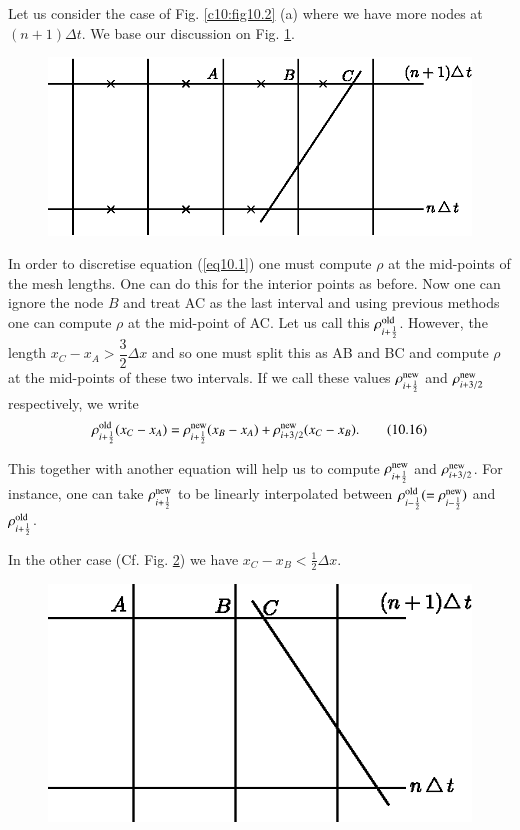 Let us consider the case of Fig. \ref{c10:fig10.2} (a) where we have
more nodes at 
$(n+1)\Delta t$. We base our discussion on Fig. \ref{c10:fig10.3}. 

\begin{figure}[H]
\centering
\includegraphics{figures/fig52-10.3.eps}
\caption{}\label{c10:fig10.3}
\end{figure}\pageoriginale

In order to discretise equation (\ref{eq10.1}) one must compute $\rho$ at the mid-points of the mesh lengths. One can do this for the interior points as before. Now one can ignore the node $B$ and treat AC as the last interval and using previous methods one can compute $\rho$ at the mid-point of AC. Let us call this $\rho^{\rm old}_{i+\frac{1}{2}}$. However, the length $x_C - x_A > \dfrac{3}{2} \Delta x $ and so one must split this as AB and BC and compute $\rho$ at the mid-points of these two intervals. If we call these values $\rho^{\rm new}_{i+\frac{1}{2}}$ and $\rho^{\rm new}_{i+3/2}$ respectively, we write
\begin{equation*}
\rho^{\rm old}_{i+\frac{1}{2}} (x_C - x_A) = \rho^{\rm new}_{i+\frac{1}{2}} (x_B- x_A) + \rho^{\rm new}_{i+3/2} (x_C - x_B). \tag{10.16}\label{eq10.16}
\end{equation*}

This together with another equation will help us to compute $\rho^{\rm
  new}_{i+\frac{1}{2}}$ and $\rho^{\rm new}_{i+3/2}$. For instance,
one can take $\rho^{\rm new}_{i+\frac{1}{2}}$ to be linearly
interpolated between $\rho^{\rm old}_{i-\frac{1}{2}} (=\rho^{\rm
  new}_{i-\frac{1}{2}})$ and $\rho^{\rm old}_{i+\frac{1}{2}}$. 

In the other case (Cf. Fig. \ref{c10:fig10.4}) we have $x_C - x_B <
\frac{1}{2} \Delta x$.  

\begin{figure}[H]
\centering
\includegraphics{figures/fig52-10.4.eps}
\caption{}\label{c10:fig10.4}
\end{figure}\pageoriginale

